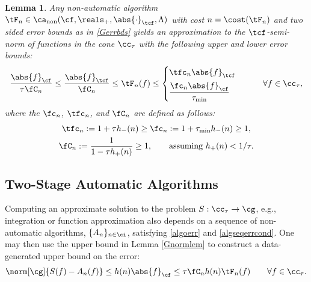\documentclass[]{elsarticle}
\DeclareMathOperator{\fix}{non}
\newtheorem{lem}{Lemma}
\theoremstyle{definition}
\theoremstyle{remark}
\newcommand{\Fnorm}[1]{\abs{#1}_{\cf}}
\newcommand{\Ftnorm}[1]{\abs{#1}_{\tcf}}
\begin{document}
\begin{lem} \label{Gnormlem} Any non-automatic algorithm $\tF_n \in \ca_{\fix}(\cf,\reals_+,\Ftnorm{\cdot},\Lambda)$ with cost $n=\cost(\tF_n)$ and two sided error bounds as in \eqref{Gerrbds} yields an approximation to the $\tcf$-semi-norm of functions in the cone $\cc_{\tau}$ with the following upper and lower error bounds:
\begin{equation} \label{twosidedGineq}
 \frac{\Fnorm{f}}{\tau \fC_n}  \le \frac{\Ftnorm{f}}{\fC_n}  \le \tF_n(f) \le  \begin{cases} \tfc_n \Ftnorm{f} \\[1ex]
\displaystyle \frac{\fc_n \Fnorm{f} }{\tau_{\min}}
\end{cases} \qquad \forall f \in \cc_{\tau},
\end{equation}
where the $\fc_n$, $\tfc_n$, and $\fC_n$ are defined as follows:
\begin{gather} \label{normdeflate}
\tfc_n :=1 + \tau h_{ -}(n)  \ge \fc_n :=1 + \tau_{\min} h_{ -}(n)  \ge 1, \\
\label{norminflate}
\fC_n :=\frac{1}{1 - \tau h_{ +}(n)} \ge 1, \qquad \text{assuming } h_{ +}(n) < 1/\tau.
\end{gather}
\end{lem}

\subsection{Two-Stage Automatic Algorithms} \label{twostagesec}

Computing an approximate solution to the problem $S: \cc_{\tau} \to \cg$, e.g., integration or function approximation also depends on a sequence of non-automatic algorithms, $\{A_n\}_{n \in \ci}$, satisfying \eqref{algoerr} and \eqref{algseqerrcond}.  One may then use the upper bound in Lemma \eqref{Gnormlem} to construct a data-generated upper bound on the error:
\begin{equation} \label{Anerrbound}
\norm[\cg]{S(f) -  A_n(f)} \le h(n)\Fnorm{f} \le \tau  \fC_n h(n)\tF_n(f) \qquad \forall f \in \cc_{\tau}.
\end{equation}
\end{document}
